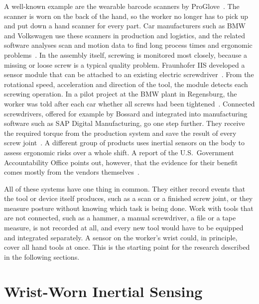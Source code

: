 A well-known example are the wearable barcode scanners by
ProGlove~\cite{proglove2026automotive, proglove2023bmw}. The scanner
is worn on the back of the hand, so the worker no longer has to pick up and put
down a hand scanner for every part. Car manufacturers such as BMW and
Volkswagen use these scanners in production and logistics, and the related
software analyses scan and motion data to find long process times and
ergonomic problems~\cite{proglove2026automotive, proglove2023bmw}. In the
assembly itself, screwing is monitored most closely, because a missing or
loose screw is a typical quality problem. Fraunhofer IIS developed a sensor
module that can be attached to an existing electric
screwdriver~\cite{fraunhofer2017tool}. From the
rotational speed, acceleration and direction of the tool, the module detects
each screwing operation. In a pilot project at the BMW plant in Regensburg, the
worker was told after each car whether all screws had been
tightened~\cite{fraunhofer2017tool}. Connected screwdrivers, offered for
example by Bossard and integrated into manufacturing software such as SAP
Digital Manufacturing, go one step further. They receive the required torque
from the production system and save the result of every screw
joint~\cite{bossard2026smarttool, sap2026intelligenttools}. A different group
of products uses inertial sensors on the body to assess ergonomic risks over a
whole shift. A report of the U.S.\ Government Accountability Office points out,
however, that the evidence for their benefit comes mostly from the vendors
themselves~\cite{gao2024wearables}.

All of these systems have one thing in common. They either record events that
the tool or device itself produces, such as a scan or a finished screw joint,
or they measure posture without knowing which task is being done. Work with
tools that are not connected, such as a hammer, a manual screwdriver, a file or
a tape measure, is not recorded at all, and every new tool would have to be
equipped and integrated separately. A sensor on the worker's wrist could, in
principle, cover all hand tools at once. This is the starting point for the
research described in the following sections.

\section{Wrist-Worn Inertial Sensing}
\label{sec:sota-imu}

